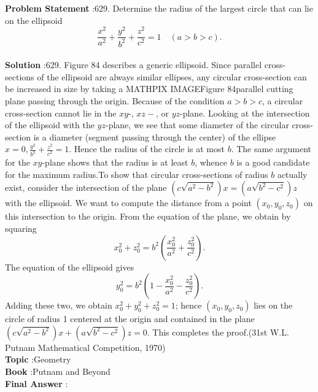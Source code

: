 \documentclass[10pt]{article}
\begin{document}
\textbf{Problem Statement} :629. Determine the radius of the largest circle that can lie on the ellipsoid$$ \frac{x^{2}}{a^{2}}+\frac{y^{2}}{b^{2}}+\frac{z^{2}}{c^{2}}=1 \quad(a>b>c) . $$\\
\textbf{Solution} :629. Figure 84 describes a generic ellipsoid. Since parallel cross-sections of the ellipsoid are always similar ellipses, any circular cross-section can be increased in size by taking a MATHPIX IMAGEFigure 84parallel cutting plane passing through the origin. Because of the condition $a>b>c$, a circular cross-section cannot lie in the $x y$-, $x z-$, or $y z$-plane. Looking at the intersection of the ellipsoid with the $y z$-plane, we see that some diameter of the circular cross-section is a diameter (segment passing through the center) of the ellipse $x=0, \frac{y^{2}}{b^{2}}+\frac{z^{2}}{c^{2}}=1$. Hence the radius of the circle is at most $b$. The same argument for the $x y$-plane shows that the radius is at least $b$, whence $b$ is a good candidate for the maximum radius.To show that circular cross-sections of radius $b$ actually exist, consider the intersection of the plane $\left(c \sqrt{a^{2}-b^{2}}\right) x=\left(a \sqrt{b^{2}-c^{2}}\right) z$ with the ellipsoid. We want to compute the distance from a point $\left(x_{0}, y_{0}, z_{0}\right)$ on this intersection to the origin. From the equation of the plane, we obtain by squaring$$ x_{0}^{2}+z_{0}^{2}=b^{2}\left(\frac{x_{0}^{2}}{a^{2}}+\frac{z_{0}^{2}}{c^{2}}\right) . $$The equation of the ellipsoid gives$$ y_{0}^{2}=b^{2}\left(1-\frac{x_{0}^{2}}{a^{2}}-\frac{z_{0}^{2}}{c^{2}}\right) . $$Adding these two, we obtain $x_{0}^{2}+y_{0}^{2}+z_{0}^{2}=1$; hence $\left(x_{0}, y_{0}, z_{0}\right)$ lies on the circle of radius 1 centered at the origin and contained in the plane $\left(c \sqrt{a^{2}-b^{2}}\right) x+\left(a \sqrt{b^{2}-c^{2}}\right) z=0$. This completes the proof.(31st W.L. Putnam Mathematical Competition, 1970)\\
\textbf{Topic} :Geometry\\
\textbf{Book} :Putnam and Beyond\\
\textbf{Final Answer} :\\
\end{document}
